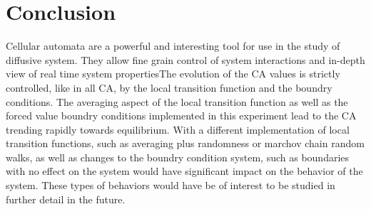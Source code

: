 \documentclass[11pt,twocolumn]{article}
\begin{document}
\vspace{5mm}

\section{Conclusion}
Cellular automata are a powerful and interesting tool for use in the study of diffusive system. They allow fine grain control of system interactions and in-depth view of real time system properties\cite{weimar}The evolution of the CA values is strictly controlled, like in all CA, by the local transition function and the boundry conditions\cite{wolfram94}. The averaging aspect of the local transition function as well as the forced value boundry conditions implemented in this experiment lead to the CA trending rapidly towards equilibrium. 
With a different implementation of local transition functions, such as averaging plus randomness\cite{yang01} or marchov chain random walks, as well as 
changes to the boundry condition system, such as boundaries with no effect on the system would have significant impact on the behavior of the system. 
These types of behaviors would have be of interest to be studied in further detail in the future.
\end{document}
